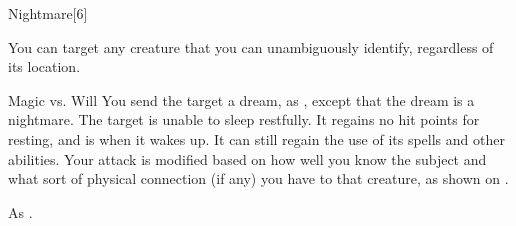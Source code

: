 \begin{spellsection}{Nightmare}[6]
    \begin{spellheader}
    \end{spellheader}
    \begin{spellcontent}
        \begin{spelltargetinginfo}
        \end{spelltargetinginfo}
        \begin{spelleffects}

            \spellspecial You can target any creature that you can unambiguously identify, regardless of its location.
            \begin{spellattack}{Magic vs. Will}
                \spelleffect You send the target a dream, as , except that the dream is a nightmare.
                \spellsuccess The target is unable to sleep restfully. It regains no hit points for resting, and is \fatigued when it wakes up. It can still regain the use of its spells and other abilities.
                \spellspecial Your attack is modified based on how well you know the subject and what sort of physical connection (if any) you have to that creature, as shown on .
            \end{spellattack}
        \end{spelleffects}
    \end{spellcontent}
    \begin{spellfooter}
        \spellnotes As .
    \end{spellfooter}
\end{spellsection}

